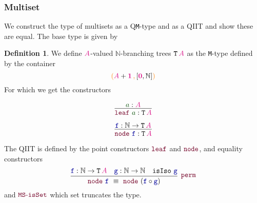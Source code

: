 \documentclass[xelatex,mathserif,serif,notheorems]{beamer} %
\theoremstyle{plain} %
\theoremstyle{definition}
\newtheorem{defn}[thm]{Definition}%
\theoremstyle{remark}
\newcommand*{\term}[1]{\textcolor{green!30!black}{#1}} %
\newcommand*{\type}[1]{\textcolor{magenta!90!black}{#1}}
\newcommand*{\containerpair}[2]{\ensuremath{\colorlet{savedleftcolor}{.}\color{orange}\left(\color{savedleftcolor}#1\,\textcolor{orange}{\mathbf{,}}\,#2\color{orange}\right)\color{savedleftcolor}}}
\newcommand*{\unit}{\type{\textbf{1}}}
\newcommand*{\empt}{\type{\textbf{0}}}
\newcommand*{\function}[1]{\textcolor{blue!60!black}{\ensuremath{\mathtt{#1}}}}
\newcommand*{\constructor}[1]{\textcolor{purple!60!black}{\ensuremath{\mathtt{#1}}}}
\newcommand*{\typeformer}[1]{\ensuremath{\mathtt{#1}}}
\newcommand{\setlengths}{
  \setlength{\abovedisplayskip}{4pt}
  \setlength{\belowdisplayskip}{4pt}
  \setlength{\abovedisplayshortskip}{2pt}
  \setlength{\belowdisplayshortskip}{2pt}
}
\begin{document}
\begin{frame}
  \frametitle{Multiset}
  We construct the type of multisets as a Q\texttt{M}-type and as a QIIT and show these are equal. The base type is given by
  \begin{defn}\setlengths
    We define \(\type{A}\)-valued \(\mathbb{N}\)-branching trees \(\typeformer{T}\,\type{A}\) as the \texttt{M}-type defined by the container
    \begin{equation}
      \containerpair{\type{A}+\unit}{[\empt , \mathbb{N}]}
    \end{equation}
    For which we get the constructors\\
      \strut
      \hfill
      \begin{minipage}[b]{0.30\linewidth}
        \begin{equation}
          \vcenter{\infer{\constructor{leaf}~\term{a} : \typeformer{T}\,\type{A}}{\term{a} : \type{A}}}
        \end{equation}
      \end{minipage}
      \hfill
      \begin{minipage}[b]{0.30\linewidth}
        \begin{equation}
          \vcenter{\infer{\constructor{node}~\function{f} : \typeformer{T}\,\type{A}}{\function{f} : \mathbb{N} \rightarrow \typeformer{T}\,\type{A}}}
        \end{equation}
      \end{minipage}
      \hfill
      \strut
    \end{defn}
    The QIIT is defined by the point constructors \(\constructor{leaf}\) and \(\constructor{node}\), and equality constructors
    \begin{equation}
      \vcenter{\infer[\constructor{perm}]{\constructor{node}~\function{f}~\equiv~\constructor{node}~(\function{f} \circ \function{g})}{\function{f} : \mathbb{N} \rightarrow \typeformer{T}\,\type{A} & \function{g} : \mathbb{N} \rightarrow \mathbb{N} & \mathtt{isIso}~\function{g}}}
    \end{equation}
    and \(\constructor{MS\text{-}isSet}\) which set truncates the type.    
\end{frame}
\end{document}
